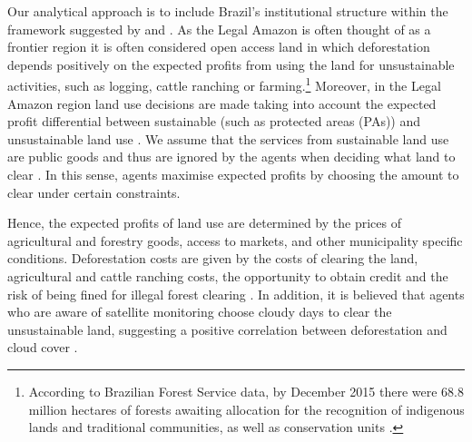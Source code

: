 Our analytical approach is to include Brazil's institutional structure within the framework suggested by \citet{ANGELSEN4} and \citet{hargrave_kis-katos_2012}. As the Legal Amazon is often thought of as a frontier region it is often considered open access land in which deforestation depends positively on the expected profits from using the land for unsustainable activities, such as logging, cattle ranching or farming.\footnote{According to Brazilian Forest Service data, by December 2015 there were 68.8 million hectares of forests awaiting allocation for the recognition of indigenous lands and traditional communities, as well as conservation units \citep{SFB,Imazon2017}.} Moreover, in the Legal Amazon region land use decisions are made taking into account the expected profit differential between sustainable (such as protected areas (PAs)) and unsustainable land use \citep{hargrave_kis-katos_2012}. We assume that the services from sustainable land use are public goods and thus are ignored by the agents when deciding what land to clear \citep{ANGELSEN4}. In this sense, agents maximise expected profits by choosing the amount to clear under certain constraints.

Hence, the expected profits of land use are determined by the prices of agricultural and forestry goods, access to markets, and other municipality specific conditions. Deforestation costs are given by the costs of clearing the land, agricultural and cattle ranching costs, the opportunity to obtain credit and the risk of being fined for illegal forest clearing \citep{hargrave_kis-katos_2012}. In addition, it is believed that agents who are aware of satellite monitoring choose cloudy days to clear the unsustainable land, suggesting a positive correlation between deforestation and cloud cover \citep{CALIXTO}.


